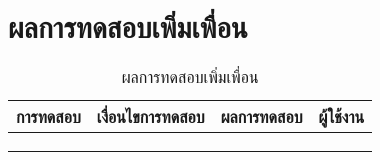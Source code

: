 \section{ผลการทดสอบเพิ่มเพื่อน}
\begin{table}[H]
	\caption{ผลการทดสอบเพิ่มเพื่อน}
    \centering	
	\label{tab:test24}
    \begin{tabular}{ | p{4cm} | p{4cm} | p{4cm} | p{2cm} | }
		\hline
	\multicolumn{1}{|c|}{การทดสอบ} & \multicolumn{1}{c|}{เงื่อนไขการทดสอบ} & \multicolumn{1}{c|}{ผลการทดสอบ} & \multicolumn{1}{c|}{ผู้ใช้งาน}                             \\ \hline
	\setstretch{1.0}{ทดสอบเพิ่มเพื่อน}
	& \setstretch{1.0}{ผู้ใช้เป็นเพื่อนกับผู้ใช้แล้ว และกดเพิ่มเพื่อน}
	& \setstretch{1.0}{ระบบแสดงข้อความ  คุณได้เป็นเพื่อนกันแล้ว } 
	&\setstretch{1.0}{\begin{flushleft}ผู้ใช้งาน\end{flushleft}} \\ \cline{2-3} 
	& \setstretch{1.0}{ผู้ใช้ส่งคำร้องขอให้กับผู้ใช้แล้ว และกดเพิ่มเพื่อน}
	& \setstretch{1.0}{ระบบแสดงข้อความ  คุณได้ส่งคำร้องขอเป็นเพื่อนแล้ว  } 
	&\setstretch{1.0}{}\\ \cline{2-3} 
	& \setstretch{1.0}{ผู้ใช้ไม่เคยส่งคำร้องขอกับผู้ใช้ และกดเพิ่มเพื่อน}
	& \setstretch{1.0}{ระบบแสดงข้อความ  คุณได้ส่งคำร้องขอไปที่ ชื่อผู้ใช้ เรียบร้อยแล้ว  } 
	&\setstretch{1.0}{}\\ \cline{2-3} \hline
    \end{tabular}
\end{table}

